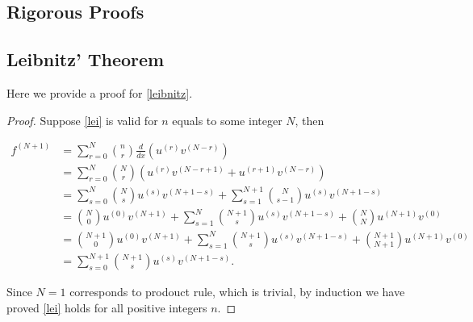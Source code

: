 \documentclass[english,a4paper,12pt]{report}
\begin{document}
\begin{appendices}
\chapter{Rigorous Proofs}
\section{Leibnitz' Theorem} \label{leibnitzapp} 

Here we provide a proof for \cref{leibnitz}.

\begin{proof}
Suppose \cref{lei} is valid for \(n\) equals to some integer \(N\), then

\begin{equation}
    \begin{aligned}
        f^{(N+1)} &= \sum_{r=0}^{N} \binom{n}{r} \frac{d}{dx}(u^{(r)} v^{(N-r)} ) \\
        &= \sum_{r=0}^{N} \binom{N}{r} (u^{(r)} v^{(N-r+1)} + u^{(r+1)}v^{(N-r)}  ) \\
        &= \sum_{s=0}^{N} \binom{N}{s}u^{(s)}v^{(N+1-s)} + \sum_{s=1}^{N+1} \binom{N}{s-1} u^{(s)}v^{(N+1-s)} \\
        &= \binom{N}{0}u^{(0)} v^{(N+1)} + \sum_{s=1}^{N} \binom{N+1}{s}u^{(s)}v^{(N+1-s)} + \binom{N}{N}u^{(N+1)} v^{(0)} \\
        &= \binom{N+1}{0}u^{(0)} v^{(N+1)} + \sum_{s=1}^{N} \binom{N+1}{s}u^{(s)}v^{(N+1-s)} + \binom{N+1}{N+1}u^{(N+1)} v^{(0)} \\
        &= \sum_{s=0}^{N+1} \binom{N+1}{s} u^{(s)}v^{(N+1-s)}.  
    \end{aligned}
\end{equation}

Since \(N=1\) corresponds to prodouct rule, which is trivial, by induction we have proved \cref{lei} holds for all positive integers \(n\). 

\end{proof}


\end{appendices}
\end{document}
